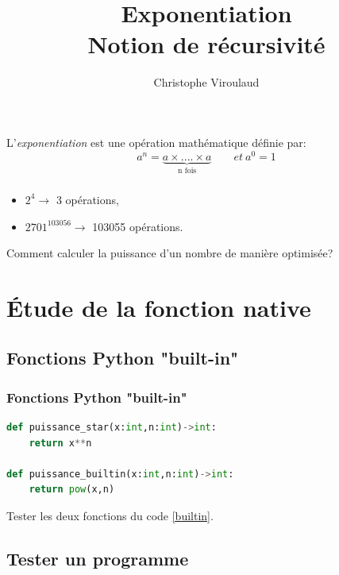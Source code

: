 \documentclass[svgnames,11pt]{beamer}
\author[]{Christophe Viroulaud}
\title{Exponentiation\\Notion de récursivité}
\date{}
\institute{Terminale - NSI}
\begin{document}
\begin{frame}
\titlepage
\end{frame}
\begin{frame}
    \frametitle{}
L'\emph{exponentiation} est une opération mathématique définie par:
    $$a^n=\underbrace{a ×....× a}_{\mbox{n fois}}\qquad et\ a^0=1$$


\end{frame}
\begin{frame}
    \frametitle{}

    \begin{itemize}
        \item $2^4 \rightarrow$ 3 opérations,
        \item $2701^{103056} \rightarrow$ 103055 opérations.
    \end{itemize}
\begin{framed}\centering Comment calculer la puissance d'un nombre de manière optimisée?
\end{framed}
\end{frame}
\section{Étude de la fonction native}
\subsection{Fonctions  Python "built-in"}
\begin{frame}[fragile]
    \frametitle{Fonctions  Python "built-in"}

\begin{center}
\begin{lstlisting}[language=Python , basicstyle=\ttfamily\small, xleftmargin=2em, xrightmargin=2em]
def puissance_star(x:int,n:int)->int:
    return x**n

def puissance_builtin(x:int,n:int)->int:
    return pow(x,n)
\end{lstlisting}
\label{builtin}
\end{center}
\begin{activite}
Tester les deux fonctions du code \ref{builtin}.
\end{activite}
\end{frame}
\subsection{Tester un programme}
\end{document}
